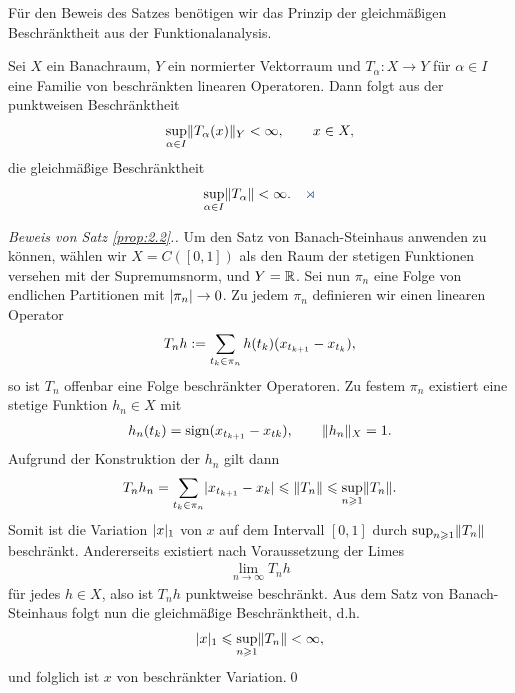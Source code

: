 Für den Beweis des Satzes benötigen wir das Prinzip der gleichmäßigen
Beschränktheit aus der Funktionalanalysis.

\begin{prop*}
Sei $X$ ein Banachraum, $Y$ ein normierter Vektorraum und
$T_\alpha : X\to Y$ für $\alpha\in I$ eine Familie von beschränkten
linearen Operatoren. Dann folgt aus der punktweisen Beschränktheit
\begin{align*}
\sup_{\alpha\in I} \lVert T_\alpha(x)\rVert_Y < \infty,\qquad x\in X,
\end{align*}
die gleichmäßige Beschränktheit
\begin{align*}
\sup_{\alpha\in I} \norm{T_\alpha} < \infty.\fish
\end{align*}
\end{prop*}

\begin{proof}[Beweis von Satz \ref{prop:2.2}.]
Um den Satz von Banach-Steinhaus anwenden zu können, wählen wir $X=C([0,1])$
als den Raum der stetigen Funktionen versehen mit der Supremumsnorm, und $Y=\mathbb{R}$.
Sei nun $\pi_n$ eine Folge von endlichen Partitionen mit $\lvert\pi_n\rvert\to 0$. Zu
jedem $\pi_n$ definieren wir einen linearen Operator
\begin{align*}
T_n h:= \sum_{t_k\in \pi_n} h(t_k)(x_{t_{k+1}}-x_{t_k}),
\end{align*}
so ist $T_n$ offenbar eine Folge beschränkter Operatoren. Zu festem $\pi_n$
existiert eine stetige Funktion $h_n\in X$ mit
\begin{align*}
h_n(t_k) = \operatorname{sign}(x_{t_{k+1}}-x_{tk}),\qquad \lVert h_n\rVert_X = 1.
\end{align*}
Aufgrund der Konstruktion der $h_n$ gilt dann
\begin{align*}
T_n h_n = \sum_{t_k\in \pi_n} \lvert x_{t_{k+1}}-x_k\rvert \leqslant \lVert T_n\rVert \leqslant
\sup_{n\geqslant 1} \lVert T_n\rVert.
\end{align*}
Somit ist die Variation $\lvert x\rvert_1$ von $x$ auf dem Intervall $[0,1]$ durch
$\sup_{n\geqslant 1} \lVert T_n\rVert$ beschränkt. Andererseits existiert nach
Voraussetzung der Limes
\begin{align*}
\lim\limits_{n\to \infty} T_n h
\end{align*}
für jedes $h\in X$, also ist $T_n h$ punktweise
beschränkt. Aus dem Satz von Banach-Steinhaus folgt nun die gleichmäßige
Beschränktheit, d.h.
\begin{align*}
\lvert x\rvert_1 \leqslant \sup_{n\geqslant 1} \lVert T_n\rVert < \infty,
\end{align*}
und folglich ist $x$ von beschränkter Variation.\qed
\end{proof}


